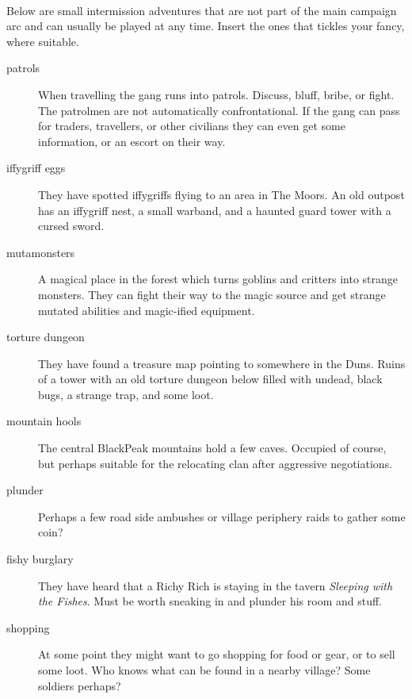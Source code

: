 \


\noindent Below are small intermission adventures that are not part of the main campaign arc and can usually be played at any time. Insert the ones that tickles your fancy,  where suitable.

\begin{description}

    \item[patrols] When travelling the gang runs into patrols. Discuss, bluff, bribe, or fight. The patrolmen are not automatically confrontational. If the gang can pass for traders, travellers, or other civilians they can even get some information, or an escort on their way.

    \item[iffygriff eggs] They have spotted iffygriffs flying to an area in The Moors. An old outpost has an iffygriff nest, a small warband, and a haunted guard tower with a cursed sword.

    \item[mutamonsters] A magical place in the forest which turns goblins and critters into strange monsters. They can fight their way to the magic source and get strange mutated abilities and magic-ified equipment.

    \item[torture dungeon] They have found a treasure map pointing to somewhere in the Duns. Ruins of a tower with an old torture dungeon below filled with undead, black bugs, a strange trap, and some loot.
    
    \item[mountain hools] The central BlackPeak mountains hold a few caves. Occupied of course, but perhaps suitable for the relocating clan after aggressive negotiations.

    \item[plunder] Perhaps a few road side ambushes or village periphery raids to gather some coin?

    \item[fishy burglary] They have heard that a Richy Rich is staying in the tavern \emph{Sleeping with the Fishes}. Must be worth sneaking in and plunder his room and stuff.

    \item[shopping] At some point they might want to go shopping for food or gear, or to sell some loot. Who knows what can be found in a nearby village? Some soldiers perhaps?

\end{description}

